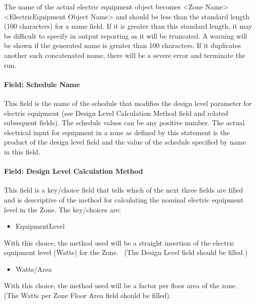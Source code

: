 The name of the actual electric equipment object becomes \textless{}Zone Name\textgreater{} \textless{}ElectricEquipment Object Name\textgreater{} and should be less than the standard length (100 characters) for a name field. If it is greater than this standard length, it may be difficult to specify in output reporting as it will be truncated. A warning will be shown if the generated name is greater than 100 characters. If it duplicates another such concatenated name, there will be a severe error and terminate the run.

\paragraph{Field: Schedule Name}\label{field-schedule-name-1-001}

This field is the name of the schedule that modifies the design level parameter for electric equipment (see Design Level Calculation Method field and related subsequent fields). The schedule values can be any positive number. The actual electrical input for equipment in a zone as defined by this statement is the product of the design level field and the value of the schedule specified by name in this field.

\paragraph{Field: Design Level Calculation Method}\label{field-design-level-calculation-method-1}

This field is a key/choice field that tells which of the next three fields are filled and is descriptive of the method for calculating the nominal electric equipment level in the Zone. The key/choices are:

\begin{itemize}
\tightlist
\item
  EquipmentLevel
\end{itemize}

With this choice, the method used will be a straight insertion of the electric equipment level (Watts) for the Zone.~ (The Design Level field should be filled.)

\begin{itemize}
\tightlist
\item
  Watts/Area
\end{itemize}

With this choice, the method used will be a factor per floor area of the zone. (The Watts per Zone Floor Area field should be filled).

